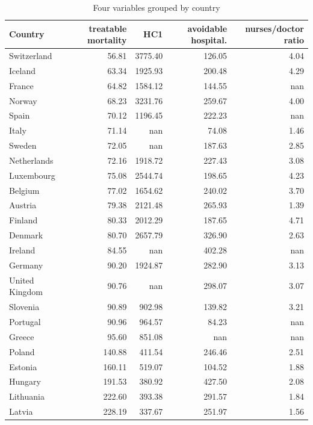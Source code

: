\documentclass[a4paper,12pt]{article}
\begin{document}
\begin{table}[htbp]
\caption{\label{tab:groupby_countries}Four variables grouped by country}
\centering
\begin{tabular}{lrrrr}
Country & treatable mortality & HC1 & avoidable hospital. & nurses/doctor ratio\\
\hline
Switzerland & 56.81 & 3775.40 & 126.05 & 4.04\\
Iceland & 63.34 & 1925.93 & 200.48 & 4.29\\
France & 64.82 & 1584.12 & 144.55 & nan\\
Norway & 68.23 & 3231.76 & 259.67 & 4.00\\
Spain & 70.12 & 1196.45 & 222.23 & nan\\
Italy & 71.14 & nan & 74.08 & 1.46\\
Sweden & 72.05 & nan & 187.63 & 2.85\\
Netherlands & 72.16 & 1918.72 & 227.43 & 3.08\\
Luxembourg & 75.08 & 2544.74 & 198.65 & 4.23\\
Belgium & 77.02 & 1654.62 & 240.02 & 3.70\\
Austria & 79.38 & 2121.48 & 265.93 & 1.39\\
Finland & 80.33 & 2012.29 & 187.65 & 4.71\\
Denmark & 80.70 & 2657.79 & 326.90 & 2.63\\
Ireland & 84.55 & nan & 402.28 & nan\\
Germany & 90.20 & 1924.87 & 282.90 & 3.13\\
United Kingdom & 90.76 & nan & 298.07 & 3.07\\
Slovenia & 90.89 & 902.98 & 139.82 & 3.21\\
Portugal & 90.96 & 964.57 & 84.23 & nan\\
Greece & 95.60 & 851.08 & nan & nan\\
Poland & 140.88 & 411.54 & 246.46 & 2.51\\
Estonia & 160.11 & 519.07 & 104.52 & 1.88\\
Hungary & 191.53 & 380.92 & 427.50 & 2.08\\
Lithuania & 222.60 & 393.38 & 291.57 & 1.84\\
Latvia & 228.19 & 337.67 & 251.97 & 1.56\\
\end{tabular}
\end{table}
\end{document}
